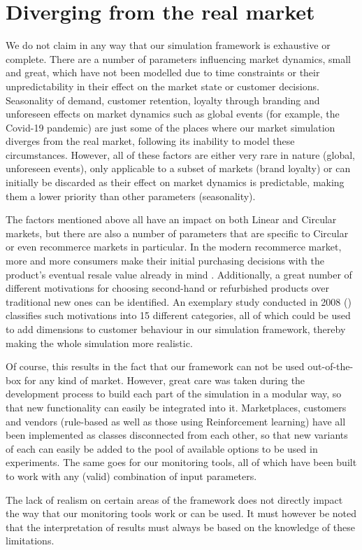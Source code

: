 \section{Diverging from the real market}\label{sec:DivergingFromRealMarket}

We do not claim in any way that our simulation framework is exhaustive or complete. There are a number of parameters influencing market dynamics, small and great, which have not been modelled due to time constraints or their unpredictability in their effect on the market state or customer decisions. Seasonality of demand, customer retention, loyalty through branding and unforeseen effects on market dynamics such as global events (for example, the Covid-19 pandemic) are just some of the places where our market simulation diverges from the real market, following its inability to model these circumstances. However, all of these factors are either very rare in nature (global, unforeseen events), only applicable to a subset of markets (brand loyalty) or can initially be discarded as their effect on market dynamics is predictable, making them a lower priority than other parameters (seasonality).

The factors mentioned above all have an impact on both Linear and Circular markets, but there are also a number of parameters that are specific to Circular or even recommerce markets in particular. In the modern recommerce market, more and more consumers make their initial purchasing decisions with the product's eventual resale value already in mind \cite{ShoppingResaleValue}. Additionally, a great number of different motivations for choosing second-hand or refurbished products over traditional new ones can be identified. An exemplary study conducted in 2008 (\cite{SecondHandMotives}) classifies such motivations into 15 different categories, all of which could be used to add dimensions to customer behaviour in our simulation framework, thereby making the whole simulation more realistic.

Of course, this results in the fact that our framework can not be used out-of-the-box for any kind of market. However, great care was taken during the development process to build each part of the simulation in a modular way, so that new functionality can easily be integrated into it. Marketplaces, customers and vendors (rule-based as well as those using Reinforcement learning) have all been implemented as classes disconnected from each other, so that new variants of each can easily be added to the pool of available options to be used in experiments. The same goes for our monitoring tools, all of which have been built to work with any (valid) combination of input parameters.

The lack of realism on certain areas of the framework does not directly impact the way that our monitoring tools work or can be used. It must however be noted that the interpretation of results must always be based on the knowledge of these limitations.